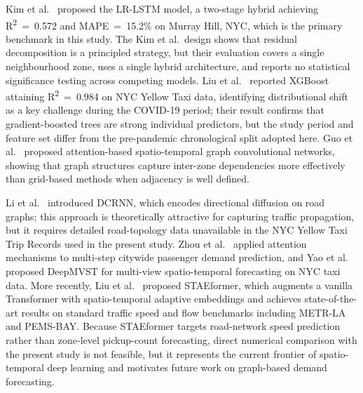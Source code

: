 Kim et al.~\parencite{kim2020hybrid} proposed the LR-LSTM model, a two-stage hybrid achieving R\textsuperscript{2}~=~0.572 and MAPE~=~15.2\% on Murray Hill, NYC, which is the primary benchmark in this study. The Kim et al.\ design shows that residual decomposition is a principled strategy, but their evaluation covers a single neighbourhood zone, uses a single hybrid architecture, and reports no statistical significance testing across competing models. Liu et al.~\parencite{liu2021epidemic} reported XGBoost attaining R\textsuperscript{2}~=~0.984 on NYC Yellow Taxi data, identifying distributional shift as a key challenge during the COVID-19 period; their result confirms that gradient-boosted trees are strong individual predictors, but the study period and feature set differ from the pre-pandemic chronological split adopted here. Guo et al.~\parencite{guo2019attention} proposed attention-based spatio-temporal graph convolutional networks, showing that graph structures capture inter-zone dependencies more effectively than grid-based methods when adjacency is well defined.

Li et al.~\parencite{li2018diffusion} introduced DCRNN, which encodes directional diffusion on road graphs; this approach is theoretically attractive for capturing traffic propagation, but it requires detailed road-topology data unavailable in the NYC Yellow Taxi Trip Records used in the present study. Zhou et al.~\parencite{zhou2018predicting} applied attention mechanisms to multi-step citywide passenger demand prediction, and Yao et al.~\parencite{yao2018deeptraffic} proposed DeepMVST for multi-view spatio-temporal forecasting on NYC taxi data. More recently, Liu et al.~\parencite{liu2023staeformer} proposed STAEformer, which augments a vanilla Transformer with spatio-temporal adaptive embeddings and achieves state-of-the-art results on standard traffic speed and flow benchmarks including METR-LA and PEMS-BAY. Because STAEformer targets road-network speed prediction rather than zone-level pickup-count forecasting, direct numerical comparison with the present study is not feasible, but it represents the current frontier of spatio-temporal deep learning and motivates future work on graph-based demand forecasting.

